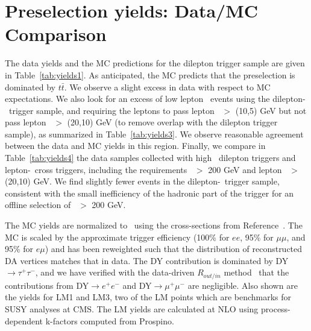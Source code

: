 \section{Preselection yields: Data/MC Comparison}
\label{sec:yields}

The data yields and the MC predictions for the dilepton trigger sample are given in Table~\ref{tab:yields1}. As anticipated, the MC predicts that the preselection is dominated by $t\bar{t}$.  
We observe a slight excess in data with respect to MC expectations.
We also look for an excess of low lepton \pt\ events using the dilepton-\Ht\ trigger sample, and
requiring the leptons to pass lepton \pt\ $>$ (10,5) GeV but not pass lepton \pt\ $>$ (20,10) GeV
(to remove overlap with the dilepton trigger sample), as summarized in Table~\ref{tab:yields3}. We observe reasonable agreement between the data and MC yields in this region.
Finally, we compare in Table~\ref{tab:yields4} the data samples collected with high \pt\ dilepton
triggers and lepton-\Ht\ cross triggers, including the requirements
\Ht\ $>$ 200 GeV and lepton \pt\ $>$ (20,10) GeV. We find slightly fewer events in the dilepton-\Ht\ trigger sample, consistent with the small inefficiency of the hadronic part of the trigger for an offline selection of \Ht\ $>$ 200 GeV.

The MC yields are normalized to \lumi\ using the cross-sections
from Reference~\cite{ref:xsec}. The MC is scaled by the approximate trigger efficiency (100\% for $ee$,
95\% for $\mu\mu$, and 95\% for $e\mu$) and has been reweighted such that the distribution of 
reconstructed DA vertices matches that in data. 
The DY contribution is dominated by DY$\rightarrow \tau^+\tau^-$,
and we have verified with the data-driven $R_{out/in}$ method~\cite{ref:top} that the
contributions from DY$\to e^{+}e^{-}$ and DY$\to \mu^{+}\mu^{-}$ are negligible.
Also shown are the yields for LM1 and LM3, two of the LM 
points which are benchmarks for SUSY analyses at CMS. The LM yields
are calculated at NLO using process-dependent k-factors computed from Prospino.



